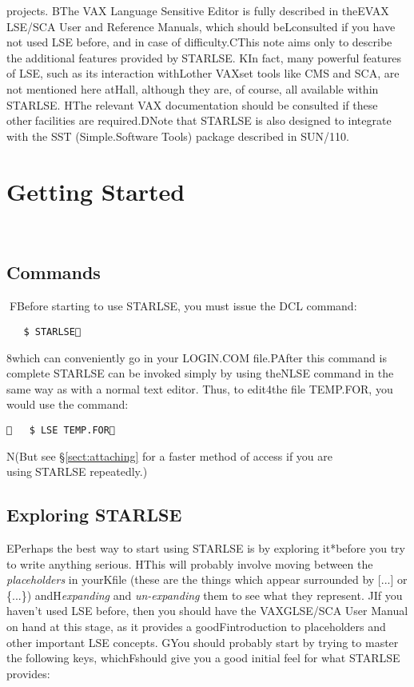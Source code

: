 projects.   B The \mbox{VAX} Language Sensitive Editor is fully described in theE \mbox{VAX} \mbox{LSE/SCA} User and Reference Manuals, which should be L consulted if you have not used \mbox{LSE} before, and in case of difficulty.C This note aims only to describe the additional features provided by  \mbox{STARLSE}. K In fact, many powerful features of \mbox{LSE}, such as its interaction with L other VAXset tools like \mbox{CMS} and \mbox{SCA}, are not mentioned here atH all, although they are, of course, all available within \mbox{STARLSE}. H The relevant \mbox{VAX} documentation should be consulted if these other facilities are required.  D Note that STARLSE is also designed to integrate with the SST (Simple. Software Tools) package described in SUN/110.      \section{Getting Started}    \subsection{Commands}  \label{sect:starting} F Before starting to use \mbox{STARLSE}, you must issue the DCL command:   \begin{verbatim}    $ STARLSE \end{verbatim}  8 which can conveniently go in your \mbox{LOGIN.COM} file.  P After this command is complete \mbox{STARLSE} can be invoked simply by using theN \mbox{LSE} command in the same way as with a normal text editor. Thus, to edit4 the file \mbox{TEMP.FOR}, you would use the command:   \begin{verbatim}    $ LSE TEMP.FOR  \end{verbatim}  N (But see \S\ref{sect:attaching} for a faster method of access if you are using STARLSE repeatedly.)     \subsection{Exploring STARLSE}  E Perhaps the best way to start using \mbox{STARLSE} is by exploring it * before you try to write anything serious. H This will probably involve moving between the {\em placeholders} in yourK file (these are the things which appear surrounded by [...] or \{...\}) and H {\em expanding} and {\em un-expanding} them to see what they represent. J If you haven't used \mbox{LSE} before, then you should have the \mbox{VAX}G \mbox{LSE/SCA} User Manual on hand at this stage, as it provides a good F introduction to placeholders and other important \mbox{LSE} concepts. G You should probably start by trying to master the following keys, which F should give you a good initial feel for what \mbox{STARLSE} provides:   
